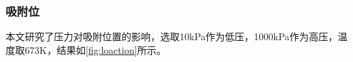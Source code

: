 


\subsubsection{吸附位}
\par{本文研究了压力对吸附位置的影响，选取10kPa作为低压，1000kPa作为高压，温度取673K，结果如\ref{fig:loaction}所示。}


